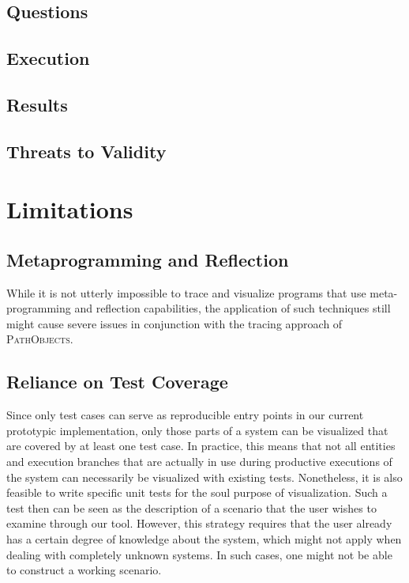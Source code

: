 \subsection{Questions}
\subsection{Execution}
\subsection{Results}
\subsection{Threats to Validity}

\clearpage
\section{Limitations}
\label{s:DiscussionLimitations}

\subsection{Metaprogramming and Reflection}
\label{ss:LimitationsMeta}
While it is not utterly impossible to trace and visualize programs that use meta-programming and reflection capabilities, the application of such techniques still might cause severe issues in conjunction with the tracing approach of \textsc{PathObjects}.


\subsection{Reliance on Test Coverage}
\label{ss:LimitationsCoverage}
Since only test cases can serve as reproducible entry points in our current prototypic implementation, only those parts of a system can be visualized that are covered by at least one test case.
In practice, this means that not all entities and execution branches that are actually in use during productive executions of the system can necessarily be visualized with existing tests.
Nonetheless, it is also feasible to write specific unit tests for the soul purpose of visualization.
Such a test then can be seen as the description of a scenario that the user wishes to examine through our tool.
However, this strategy requires that the user already has a certain degree of knowledge about the system, which might not apply when dealing with completely unknown systems. 
In such cases, one might not be able to construct a working scenario.

